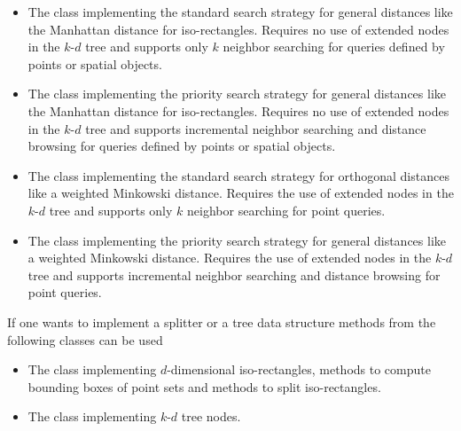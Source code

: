 \begin{itemize}

\item
The class  
implementing the standard search strategy for general distances
like the Manhattan distance for iso-rectangles.
Requires no use of extended nodes in the $k$-$d$ tree and supports only $k$
neighbor searching for queries defined by points or spatial objects.


\item
The class  implementing the priority search 
strategy for general distances
like the Manhattan distance for iso-rectangles.
Requires no use of extended nodes in the $k$-$d$ tree and supports incremental
neighbor searching and distance browsing for queries defined by points or spatial objects.

\item
The class  implementing the standard search strategy for 
orthogonal distances
like a weighted Minkowski distance. Requires the use of extended nodes in the $k$-$d$ tree and supports 
only $k$ neighbor searching for point queries.

\item
The class  implementing the priority search strategy for general 
distances
like a weighted Minkowski distance. Requires the use of extended nodes in the $k$-$d$ tree and supports incremental
neighbor searching and distance browsing for point queries.

\end{itemize}

If one wants to implement a splitter or a tree data structure
methods from the following classes can be used

\begin{itemize}

\item
The class  implementing $d$-dimensional iso-rectangles, 
methods to compute bounding boxes
of point sets and methods to split iso-rectangles.

\item
The class  implementing $k$-$d$ tree nodes.

\end{itemize}

